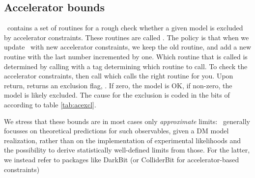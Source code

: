 
\subsection{Accelerator bounds}

\ds\ contains a set of routines for a rough check whether a given model is excluded by
accelerator constraints. These routines are called . The
policy is that when we update \ds\ with new accelerator constraints, we keep
the old routine, and add a new routine with the last number incremented by one.
Which routine that is called is determined by calling  with a
tag determining which routine to call. To check the accelerator constraints, 
then call  which calls the right routine for you. Upon return,
 returns an exclusion flag, . If zero, the model
is OK, if non-zero, the model is likely excluded. The cause for the exclusion is coded
in the bits of  according to table \ref{tab:acexcl}. 

We stress that these bounds are in most cases only {\it approximate} limits: \ds\ generally 
focusses on theoretical predictions for such observables, given a DM model realization,
rather than on the implementation of experimental likelihoods and the possibility to derive
statistically well-defined limits from those. For the latter, we instead refer to packages like 
{\sf DarkBit} \cite{Workgroup:2017lvb} (or  {\sf ColliderBit} \cite{Balazs:2017moi} for 
accelerator-based constraints)

